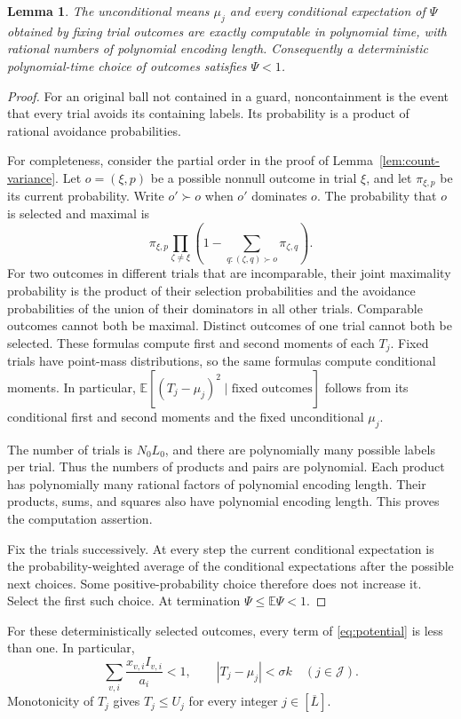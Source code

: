 \documentclass[11pt]{article}
\numberwithin{equation}{section}
\newtheorem{lemma}[theorem]{Lemma}
\theoremstyle{definition}
\newcommand{\E}{\mathbb E}
\newcommand{\cL}{\overline L}
\begin{document}
\begin{lemma}\label{lem:conditional-computation}
The unconditional means $\mu_j$ and every conditional expectation of
$\Psi$ obtained by fixing trial outcomes are exactly computable in
polynomial time, with rational numbers of polynomial encoding length.
Consequently a deterministic polynomial-time choice of outcomes
satisfies $\Psi<1$.
\end{lemma}
\begin{proof}
For an original ball not contained in a guard, noncontainment is the
event that every trial avoids its containing labels. Its probability is
a product of rational avoidance probabilities.

For completeness, consider the partial order in the proof of
Lemma~\ref{lem:count-variance}. Let $o=(\xi,p)$ be a possible nonnull
outcome in trial $\xi$, and let $\pi_{\xi,p}$ be its current probability.
Write $o'\succ o$ when $o'$ dominates $o$.
The probability that $o$ is selected and maximal is
\[
 \pi_{\xi,p}\prod_{\zeta\ne\xi}
       \left(1-\sum_{q:(\zeta,q)\succ o}\pi_{\zeta,q}\right).
\]
For two outcomes in different trials that are incomparable, their joint
maximality probability is the product of their selection probabilities
and the avoidance probabilities of the union of their dominators in
all other trials. Comparable outcomes cannot both be maximal.
Distinct outcomes of one trial cannot both be selected.
These formulas compute first and second moments of each $T_j$.
Fixed trials have point-mass distributions, so the same formulas compute
conditional moments. In particular,
$\E[(T_j-\mu_j)^2\mid\text{fixed outcomes}]$ follows from its conditional
first and second moments and the fixed unconditional $\mu_j$.

The number of trials is $N_0L_0$, and there are polynomially many
possible labels per trial. Thus the numbers of products and pairs are
polynomial. Each product has polynomially many rational factors of
polynomial encoding length. Their products, sums, and squares also have
polynomial encoding length. This proves the computation assertion.

Fix the trials successively. At every step the current conditional
expectation is the probability-weighted average of the conditional
expectations after the possible next choices. Some positive-probability
choice therefore does not increase it. Select the first such choice.
At termination $\Psi\le\E\Psi<1$.
\end{proof}

For these deterministically selected outcomes, every term of
\eqref{eq:potential} is less than one. In particular,
\begin{equation}\label{eq:deterministic-guarantees}
 \sum_{v,i}\frac{x_{v,i}I_{v,i}}{a_i}<1,\qquad
 |T_j-\mu_j|<\sigma k\quad(j\in\mathcal J).
\end{equation}
Monotonicity of $T_j$ gives $T_j\le U_j$ for every integer
$j\in[\cL]$.
\end{document}
